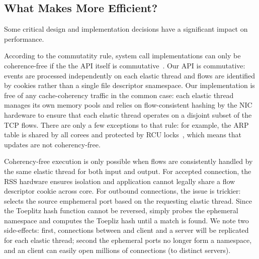 %

\subsection{What Makes \ix More Efficient?}
\label{sec:impl:better}


Some critical design and implementation decisions have a significant
impact on performance.

According to the commutatity rule, system call implementations can
only be coherence-free if the the API itself is
commutative~\cite{DBLP:conf/sosp/ClementsKZMK13}.  Our API is
commutative: events are processed independently on each elastic thread
and flows are identified by cookies rather than a single file
descriptor snamespace.  Our implementation is free of any
cache-coherency traffic in the common case: each elastic thread
manages its own memory pools and \ix relies on flow-consistent hashing
by the NIC hardeware to ensure that each elastic thread operates on a
disjoint subset of the TCP flows.   There are only a few exceptions to
that rule: for example, the ARP table is shared by all corees and
protected by RCU locks~\cite{mckenney1998read}, which means that
updates are not coherency-free.

 Coherency-free execution is only possible when flows are consistently
handled by the same elastic thread for both input and output.  For
accepted connection, the RSS hardware ensures isolation and
application cannot legally share a flow descriptor cookie across core.
For outbound connections, the issue is trickier: \ix selects the
source emphemeral port based on the requesting elastic thread. Since
the Toeplitz hash function cannot be reversed, \ix simply probes the
ephemeral namespace and computes the Toepliz hash until a match is
found.  We note two side-effects: first, connections between and \ix
client and a server will be replicated for each elastic thread; second
the ephemeral ports no longer form a namespace, and an \ix client can
easily open millions of connections (to distinct servers).

